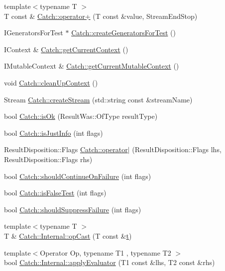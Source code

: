 \begin{DoxyCompactItemize}
\item 
{\footnotesize template$<$typename T $>$ }\\T const \& \hyperlink{a00117_a5e95b3c47a7618db3649dc39b0bb9004}{Catch\+::operator+} (T const \&value, Stream\+End\+Stop)
\item 
I\+Generators\+For\+Test $\ast$ \hyperlink{a00117_a3d93b31e88fd01ee9e0d20757ff64eab}{Catch\+::create\+Generators\+For\+Test} ()
\item 
I\+Context \& \hyperlink{a00117_ad517cca9b21deb79101e90e5508dd161}{Catch\+::get\+Current\+Context} ()
\item 
I\+Mutable\+Context \& \hyperlink{a00117_af7bb0c32ab2453d2f53e92a96d15360e}{Catch\+::get\+Current\+Mutable\+Context} ()
\item 
void \hyperlink{a00117_ae50508f10ffc4ed873a31a4db4caea16}{Catch\+::clean\+Up\+Context} ()
\item 
Stream \hyperlink{a00117_ad7591011c5d99d59504ecd3384001c3e}{Catch\+::create\+Stream} (std\+::string const \&stream\+Name)
\item 
bool \hyperlink{a00117_a5205869c81c06d3460759cb86676ae68}{Catch\+::is\+Ok} (Result\+Was\+::\+Of\+Type result\+Type)
\item 
bool \hyperlink{a00117_a54b01af61673a3e1f21f31713639b180}{Catch\+::is\+Just\+Info} (int flags)
\item 
Result\+Disposition\+::\+Flags \hyperlink{a00117_ab32a083e442cc09f736327d2e2865999}{Catch\+::operator$\vert$} (Result\+Disposition\+::\+Flags lhs, Result\+Disposition\+::\+Flags rhs)
\item 
bool \hyperlink{a00117_a7f7480b15d74965459c844f0d393ed87}{Catch\+::should\+Continue\+On\+Failure} (int flags)
\item 
bool \hyperlink{a00117_a93ef4e3e307a2021ca0d41b32c0e54b0}{Catch\+::is\+False\+Test} (int flags)
\item 
bool \hyperlink{a00117_ab91eb13081203d634fe48d3d2ab386d7}{Catch\+::should\+Suppress\+Failure} (int flags)
\item 
{\footnotesize template$<$typename T $>$ }\\T \& \hyperlink{a00120_adde98c1a650e94615e2b37ab0b3734e2}{Catch\+::\+Internal\+::op\+Cast} (T const \&\hyperlink{a00107_aaccc9105df5383111407fd5b41255e23}{t})
\item 
{\footnotesize template$<$Operator Op, typename T1 , typename T2 $>$ }\\bool \hyperlink{a00120_a3849d993997f2b708281ff02e77dfecf}{Catch\+::\+Internal\+::apply\+Evaluator} (T1 const \&lhs, T2 const \&rhs)

\end{DoxyCompactItemize}
